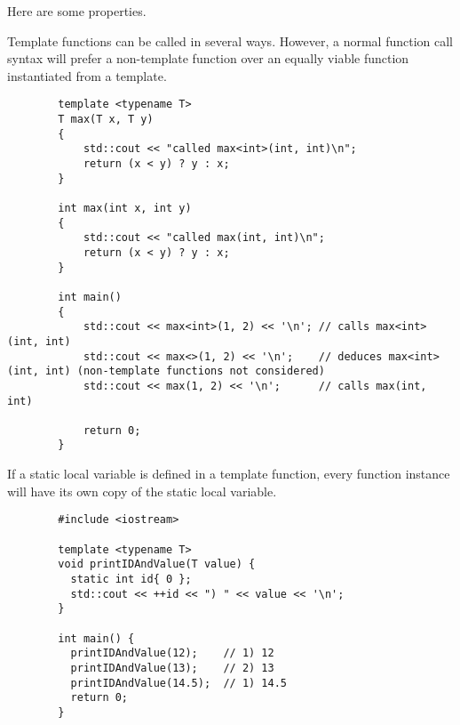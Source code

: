 \documentclass{article}
\begin{document}
    Here are some properties. 

    \begin{lemma}
      Template functions can be called in several ways. However, a normal function call syntax will prefer a non-template function over an equally viable function instantiated from a template. 

      \begin{lstlisting}
        template <typename T>
        T max(T x, T y)
        {
            std::cout << "called max<int>(int, int)\n";
            return (x < y) ? y : x;
        }

        int max(int x, int y)
        {
            std::cout << "called max(int, int)\n";
            return (x < y) ? y : x;
        }

        int main()
        {
            std::cout << max<int>(1, 2) << '\n'; // calls max<int>(int, int)
            std::cout << max<>(1, 2) << '\n';    // deduces max<int>(int, int) (non-template functions not considered)
            std::cout << max(1, 2) << '\n';      // calls max(int, int)

            return 0;
        } 
      \end{lstlisting}
    \end{lemma} 

    \begin{lemma}
      If a static local variable is defined in a template function, every function instance will have its own copy of the static local variable. 
      \begin{lstlisting}
        #include <iostream>

        template <typename T>
        void printIDAndValue(T value) {
          static int id{ 0 };
          std::cout << ++id << ") " << value << '\n';
        }

        int main() {
          printIDAndValue(12);    // 1) 12
          printIDAndValue(13);    // 2) 13 
          printIDAndValue(14.5);  // 1) 14.5
          return 0;
        } 
      \end{lstlisting}
    \end{lemma} 
\end{document}
